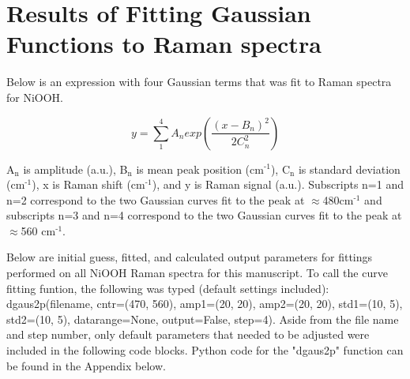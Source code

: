 \documentclass[journal=jpccck,manuscript=suppinfo,email=true]{achemso}
\begin{document}
\section{Results of Fitting Gaussian Functions to Raman spectra}
\label{sec-4}
Below is an expression with four Gaussian terms that was fit to Raman spectra for NiOOH.

$$y = \sum_{1}^{4} A_{n} exp\left (\frac{(x-B_{n})^{2}}{2C_{n}^{2}}\right )$$

A$_{\text{n}}$ is amplitude (a.u.), B$_{\text{n}}$ is mean peak position (cm$^{\text{-1}}$), C$_{\text{n}}$ is standard deviation (cm$^{\text{-1}}$), x is Raman shift (cm$^{\text{-1}}$), and y is Raman signal (a.u.). Subscripts n=1 and n=2 correspond to the two Gaussian curves fit to the peak at $\approx$480cm$^{\text{-1}}$ and subscripts n=3 and n=4 correspond to the two Gaussian curves fit to the peak at $\approx$560 cm$^{\text{-1}}$.

Below are initial guess, fitted, and calculated output parameters for fittings performed on all NiOOH Raman spectra for this manuscript. To call the curve fitting funtion, the following was typed (default settings included): dgaus2p(filename, cntr=(470, 560), amp1=(20, 20), amp2=(20, 20), std1=(10, 5), std2=(10, 5), datarange=None, output=False, step=4). Aside from the file name and step number, only default parameters that needed to be adjusted were included in the following code blocks. Python code for the "dgaus2p" function can be found in the Appendix below.
\end{document}
